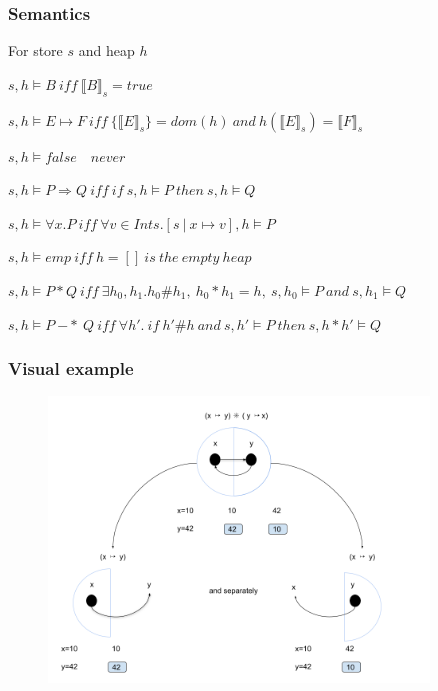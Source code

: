 \documentclass[professionalfont]{beamer}
\begin{document}
    \begin{frame}
        \frametitle{Semantics}
        
        For store $s$ and heap $h$
        \scriptsize
        \begin{card}
        \pause
        $s,h \models B\ iff\ \llbracket B \rrbracket_s = true$
       

        \bigskip
        $s,h \models  E \mapsto F\ iff\ \{\llbracket E \rrbracket_s\} = dom(h)\ and\ h(\llbracket E \rrbracket_s)=\llbracket F \rrbracket_s$
        
        
        \bigskip
        $s,h \models false \quad never $
   
        
        \bigskip
        $s,h \models  P \Rightarrow Q\ iff\ if\ s,h \models P\ then\ s,h \models Q$
        
        
        \bigskip
        $s,h \models  \forall x.P\ iff\ \forall v \in Ints. [s\ |\ x \mapsto v ],h \models P $
        \pause
        
        \bigskip
        $s,h \models  emp\ iff\ h=[]\ is\ the\ empty\ heap $
      
        \bigskip
        $s,h \models  P \ast Q\ iff\ \exists h_0, h_1. h_0 \# h_1,\ h_0 \ast h_1 = h,\ s,h_0 \models P\ and\ s,h_1 \models Q $
        
        \bigskip
        $s,h \models  P\ {-*}\ Q\ iff\ \forall h'.\ if\ h'\#h\ and\ s,h' \models P\ then\ s,h\ast h' \models Q$
       
        
        \end{card}
    \end{frame}
    \begin{frame}
        \frametitle{Visual example}
        \begin{figure}
        \includegraphics[width=0.9\textwidth]{img/ex1.png}
        \end{figure}
       

    \end{frame}
\end{document}
